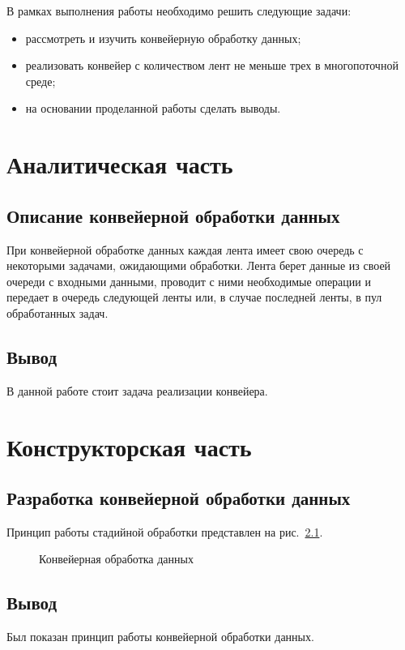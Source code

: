 \documentclass[a4paper,14pt]{extreport}
\newcommand{\imgext}[4] {
	\begin{figure}[h!]
		\center{\texttt{[image: inc/img/\#2.\#3]}}
		\caption{#4}
		\label{img:#2}
	\end{figure}
}
\begin{document}
В рамках выполнения работы необходимо решить следующие задачи:
\begin{itemize}
	\item рассмотреть и изучить конвейерную обработку данных;
	\item реализовать конвейер с количеством лент не меньше трех в многопоточной среде;
	\item на основании проделанной работы сделать выводы.
\end{itemize}


\chapter{Аналитическая часть}

\section{Описание конвейерной обработки данных}

При конвейерной обработке данных каждая лента имеет свою очередь с некоторыми задачами, ожидающими обработки. Лента берет данные из своей очереди с входными данными, проводит с ними необходимые операции и передает в очередь следующей ленты или, в случае последней ленты, в пул обработанных задач.

\section*{Вывод}
В данной работе стоит задача реализации конвейера.

\chapter{Конструкторская часть}

\section{Разработка конвейерной обработки данных}

Принцип работы стадийной обработки представлен на рис.~\ref{img:schema}.

\imgext{height=70mm}{schema}{pdf}{Конвейерная обработка данных}

\section*{Вывод}

Был показан принцип работы конвейерной обработки данных.
\end{document}
